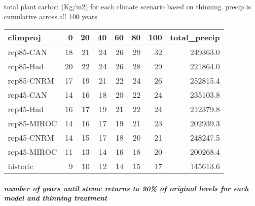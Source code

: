 \documentclass[]{article}
\let\oldsubparagraph\subparagraph
\renewcommand{\subparagraph}[1]{\oldsubparagraph{#1}\mbox{}}
\begin{document}
total plant carbon (Kg/m2) for each climate scenario based on thinning.
precip is cumulative across all 100 years

\begin{table}[H]
\centering
\begin{tabular}{l|r|r|r|r|r|r|r}
\hline
climproj & 0 & 20 & 40 & 60 & 80 & 100 & total\_precip\\
\hline
rcp85-CAN & 18 & 21 & 24 & 26 & 29 & 32 & 249363.0\\
\hline
rcp85-Had & 20 & 22 & 24 & 26 & 28 & 29 & 221864.0\\
\hline
rcp85-CNRM & 17 & 19 & 21 & 22 & 24 & 26 & 252815.4\\
\hline
rcp45-CAN & 14 & 16 & 18 & 20 & 22 & 24 & 235103.8\\
\hline
rcp45-Had & 16 & 17 & 19 & 21 & 22 & 24 & 212379.8\\
\hline
rcp85-MIROC & 14 & 16 & 17 & 19 & 21 & 23 & 202939.3\\
\hline
rcp45-CNRM & 14 & 15 & 17 & 18 & 20 & 21 & 248247.5\\
\hline
rcp45-MIROC & 11 & 13 & 14 & 16 & 18 & 20 & 200268.4\\
\hline
historic & 9 & 10 & 12 & 14 & 15 & 17 & 145613.6\\
\hline
\end{tabular}
\end{table}

\subparagraph{number of years until stemc returns to 90\% of original
levels for each model and thinning
treatment}\label{number-of-years-until-stemc-returns-to-90-of-original-levels-for-each-model-and-thinning-treatment}
\end{document}
